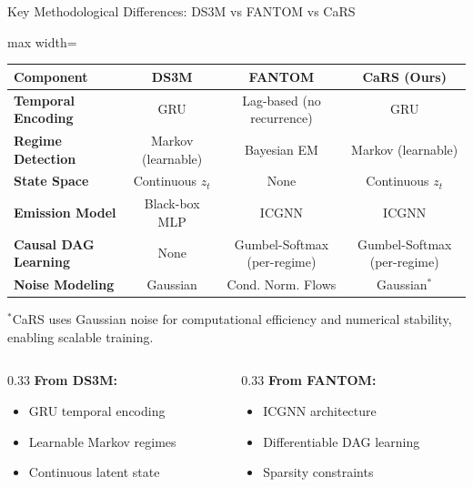 \documentclass[aspectratio=169]{beamer}
\begin{document}
\begin{frame}{Key Methodological Differences: DS3M vs FANTOM vs CaRS}
\begin{table}
\centering
\small
\begin{adjustbox}{max width=\textwidth}
\begin{tabular}{l|ccc}
\toprule
\textbf{Component} & \textbf{DS3M} & \textbf{FANTOM} & \textbf{CaRS (Ours)} \\
\midrule
\textbf{Temporal Encoding} & GRU & Lag-based (no recurrence) & GRU \\
\textbf{Regime Detection} & Markov (learnable) & Bayesian EM & Markov (learnable) \\
\textbf{State Space} & Continuous $z_t$ & \textcolor{warnred}{None} & Continuous $z_t$ \\
\textbf{Emission Model} & Black-box MLP & ICGNN & ICGNN \\
\textbf{Causal DAG Learning} & \textcolor{warnred}{None} & Gumbel-Softmax (per-regime) & Gumbel-Softmax (per-regime) \\
\textbf{Noise Modeling} & Gaussian & Cond. Norm. Flows & Gaussian$^*$ \\
\bottomrule
\end{tabular}    
\end{adjustbox}
\end{table}

{\scriptsize $^*$CaRS uses Gaussian noise for computational efficiency and numerical stability, enabling scalable training.} %

\vspace{0.1cm}
\begin{columns}
\begin{column}{0.33\textwidth}
\textcolor{paperblue}{\textbf{From DS3M:}}
\begin{itemize}
    \item GRU temporal encoding
    \item Learnable Markov regimes
    \item Continuous latent state
\end{itemize}
\end{column}

\begin{column}{0.33\textwidth}
\textcolor{paperblue}{\textbf{From FANTOM:}}
\begin{itemize}
    \item ICGNN architecture
    \item Differentiable DAG learning
    \item Sparsity constraints
\end{itemize}
\end{column}


\end{columns}
\end{frame}
\end{document}
